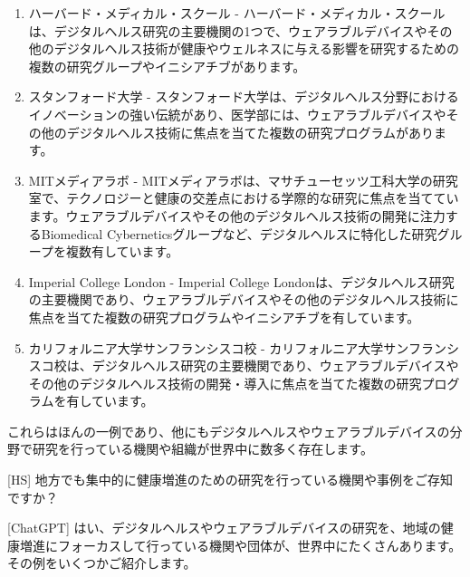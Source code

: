 \documentclass[
]{bxjsbook}
\providecommand{\tightlist}{%
  \setlength{\itemsep}{0pt}\setlength{\parskip}{0pt}}
\theoremstyle{definition}
\theoremstyle{definition}
\theoremstyle{definition}
\theoremstyle{definition}
\theoremstyle{remark}
\begin{document}
\begin{enumerate}
\def\labelenumi{\arabic{enumi}.}
\tightlist
\item
  ハーバード・メディカル・スクール - ハーバード・メディカル・スクールは、デジタルヘルス研究の主要機関の1つで、ウェアラブルデバイスやその他のデジタルヘルス技術が健康やウェルネスに与える影響を研究するための複数の研究グループやイニシアチブがあります。
\item
  スタンフォード大学 - スタンフォード大学は、デジタルヘルス分野におけるイノベーションの強い伝統があり、医学部には、ウェアラブルデバイスやその他のデジタルヘルス技術に焦点を当てた複数の研究プログラムがあります。
\item
  MITメディアラボ - MITメディアラボは、マサチューセッツ工科大学の研究室で、テクノロジーと健康の交差点における学際的な研究に焦点を当てています。ウェアラブルデバイスやその他のデジタルヘルス技術の開発に注力するBiomedical Cyberneticsグループなど、デジタルヘルスに特化した研究グループを複数有しています。
\item
  Imperial College London - Imperial College Londonは、デジタルヘルス研究の主要機関であり、ウェアラブルデバイスやその他のデジタルヘルス技術に焦点を当てた複数の研究プログラムやイニシアチブを有しています。
\item
  カリフォルニア大学サンフランシスコ校 - カリフォルニア大学サンフランシスコ校は、デジタルヘルス研究の主要機関であり、ウェアラブルデバイスやその他のデジタルヘルス技術の開発・導入に焦点を当てた複数の研究プログラムを有しています。
\end{enumerate}

これらはほんの一例であり、他にもデジタルヘルスやウェアラブルデバイスの分野で研究を行っている機関や組織が世界中に数多く存在します。

{[}HS{]} 地方でも集中的に健康増進のための研究を行っている機関や事例をご存知ですか？

{[}ChatGPT{]} はい、デジタルヘルスやウェアラブルデバイスの研究を、地域の健康増進にフォーカスして行っている機関や団体が、世界中にたくさんあります。その例をいくつかご紹介します。
\end{document}
